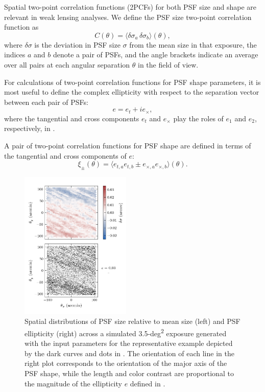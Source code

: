 \documentclass[twocolumn]{aastex631}
\begin{document}
Spatial two-point correlation functions (2PCFs) for both PSF size and shape are relevant in weak lensing analyses. 
We define the PSF size two-point correlation function as 
\begin{equation}
    C(\theta) = \langle \delta\sigma_a \, \delta\sigma_b\rangle(\theta),
    \label{eqn:shape_corr}
\end{equation}
where $\delta\sigma$ is the deviation in PSF size $\sigma$ from the mean size in that exposure, the indices $a$ and $b$ denote a pair of PSFs, and the angle brackets indicate an average over all pairs at each angular separation $\theta$ in the field of view. 

For calculations of two-point correlation functions for PSF shape parameters, it is most useful to define the complex ellipticity with respect to the separation vector between each pair of PSFs:%
\begin{equation}
e = e_t + i e_\times,
\label{eqn:e_deftx}
\end{equation}
where the tangential  and cross components $e_t$ and $e_\times$ play the roles of $e_1$ and $e_2$, respectively, in . 

A pair of two-point correlation functions for PSF shape are defined in terms of the tangential and cross components of $e$: 
\begin{equation}
    \xi_\pm(\theta) = \langle e_{t,a} e_{t,b} \pm e_{\times,a} e_{\times,b} \rangle(\theta). 
\end{equation}


\begin{figure}
\includegraphics[width=0.47\textwidth]{f3_output_example.png}
    \caption{
    Spatial distributions of PSF size relative to mean size (left) and PSF ellipticity (right) across a simulated 3.5-\unit{deg^2} exposure generated with the \psfws input parameters for the representative example depicted by the dark curves and dots in .   
    The orientation of each line in the right plot corresponds to the orientation of the major axis of the PSF shape, while the length and color contrast are proportional to the magnitude of the ellipticity $e$ defined in . 
    \label{fig:output}
    }
\end{figure}
\end{document}
